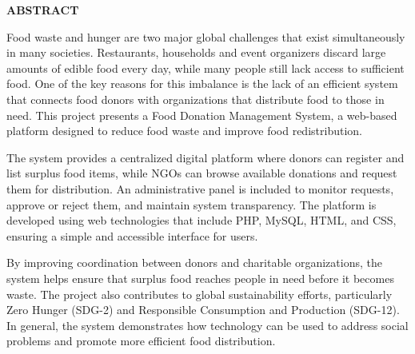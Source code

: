 \thispagestyle{plain}
\begin{center}
    \Large \textbf{\uppercase{Abstract}}
\end{center}
\vspace{3\baselineskip}
\noindent
Food waste and hunger are two major global challenges that exist simultaneously in many societies. Restaurants, households and event organizers discard large amounts of edible food every day, while many people still lack access to sufficient food. One of the key reasons for this imbalance is the lack of an efficient system that connects food donors with organizations that distribute food to those in need. This project presents a Food Donation Management System, a web-based platform designed to reduce food waste and improve food redistribution.

The system provides a centralized digital platform where donors can register and list surplus food items, while NGOs can browse available donations and request them for distribution. An administrative panel is included to monitor requests, approve or reject them, and maintain system transparency. The platform is developed using web technologies that include PHP, MySQL, HTML, and CSS, ensuring a simple and accessible interface for users.

By improving coordination between donors and charitable organizations, the system helps ensure that surplus food reaches people in need before it becomes waste. The project also contributes to global sustainability efforts, particularly Zero Hunger (SDG-2) and Responsible Consumption and Production (SDG-12). In general, the system demonstrates how technology can be used to address social problems and promote more efficient food distribution.


\vspace{\baselineskip}
\noindent

